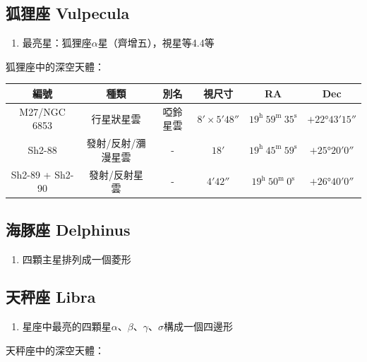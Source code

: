 
\subsection{狐狸座 Vulpecula}
\begin{enumerate}
    \item 最亮星：狐狸座\(\alpha\)星（齊增五），視星等4.4等
\end{enumerate}
狐狸座中的深空天體：
\newline

\begin{center}
\begin{longtable}{c | c | c | c | c | c}
    編號 & 種類 & 別名 & 視尺寸 & RA & Dec \\
    \hline
    \endfirsthead


    \endfoot

    \endlastfoot

    M27/NGC 6853 & 行星狀星雲 & 啞鈴星雲 & \(\ang{;8;}\times\ang{;5;48}\) & \(19^\text{h }59^\text{m }35^\text{s}\) & \(+\ang{22;43;15}\) \\ %
    Sh2-88 & 發射/反射/瀰漫星雲 & - & \(\ang{;18;}\) & \(19^\text{h }45^\text{m }59^\text{s}\) & \(+\ang{25;20;0}\) \\ %
    Sh2-89 + Sh2-90 & 發射/反射星雲 & - & \(\ang{;4;42}\) & \(19^\text{h }50^\text{m }0^\text{s}\) & \(+\ang{26;40;0}\) \\ %

\end{longtable}
\end{center}

\subsection{海豚座 Delphinus}
\begin{enumerate}
    \item 四顆主星排列成一個菱形
\end{enumerate}

\subsection{天秤座 Libra}
\begin{enumerate}
    \item 星座中最亮的四顆星\(\alpha\)、\(\beta\)、\(\gamma\)、\(\sigma\)構成一個四邊形
\end{enumerate}
天秤座中的深空天體：
\newline

